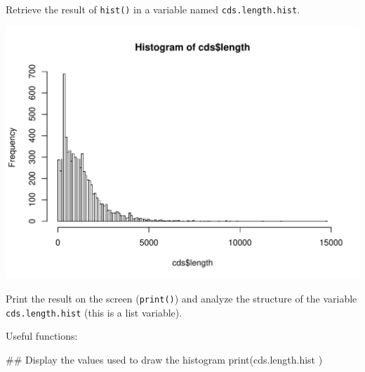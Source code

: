 \documentclass[]{article}
\newenvironment{Shaded}{\begin{snugshade}}{\end{snugshade}}
\newcommand{\KeywordTok}[1]{\textcolor[rgb]{0.94,0.87,0.69}{#1}}
\newcommand{\DataTypeTok}[1]{\textcolor[rgb]{0.87,0.87,0.75}{#1}}
\newcommand{\DecValTok}[1]{\textcolor[rgb]{0.86,0.86,0.80}{#1}}
\newcommand{\StringTok}[1]{\textcolor[rgb]{0.80,0.58,0.58}{#1}}
\newcommand{\OperatorTok}[1]{\textcolor[rgb]{0.94,0.94,0.82}{#1}}
\newcommand{\NormalTok}[1]{\textcolor[rgb]{0.80,0.80,0.80}{#1}}
\begin{document}
Retrieve the result of \texttt{hist()} in a variable named
\texttt{cds.length.hist}.

\begin{Shaded}
\end{Shaded}

\begin{center}\includegraphics{figures/unnamed-chunk-22-1} \end{center}

Print the result on the screen (\texttt{print()}) and analyze the
structure of the variable \texttt{cds.length.hist} (this is a list
variable).

Useful functions:

\begin{Shaded}
\begin{Highlighting}[]
\NormalTok{## Display the values used to draw the histogram}
\KeywordTok{print}\NormalTok{(cds.length.hist )}
\end{Highlighting}
\end{Shaded}
\end{document}
